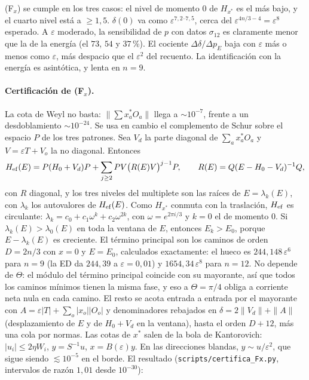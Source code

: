 \documentclass[11pt,a4paper]{article}
\theoremstyle{definition}
\theoremstyle{remark}
\newcommand{\eps}{\varepsilon}
\newcommand{\pE}{p_{E}}
\newcommand{\scr}[1]{\texttt{scripts/#1}}
\begin{document}
\noindent
(F$_x$) se cumple en los tres casos: el nivel de momento $0$ de $H_{x^*}$ es el más bajo, y el cuarto nivel
está a $\ge1{,}5$. $\delta(0)$ va como $\eps^{7{,}2\text{--}7{,}5}$, cerca del $\eps^{4n/3-4}=\eps^8$ esperado. A $\eps$
moderado, la sensibilidad de $p$ con datos $\sigma_{12}$ es claramente menor que la de la energía (el $73$, $54$ y
$37$\,\%). El cociente $\Delta\delta/\Delta\pE$ baja con $\eps$ más o menos como $\eps$, más despacio que el $\eps^2$
del recuento. La identificación con la energía es asintótica, y lenta en $n=9$.

\paragraph{Certificación de (F$_x$).} La cota de Weyl no basta: $\|\sum x^*_aO_a\|$ llega a $\sim10^{-7}$,
frente a un desdoblamiento $\sim10^{-24}$. Se usa en cambio el complemento de Schur sobre el espacio $P$ de los tres
patrones. Sea $V_d$ la parte diagonal de $\sum_ax^*_aO_a$ y $V=\eps T+V_o$ la no diagonal. Entonces
\[
  H_{\rm ef}(E)=P(H_0+V_d)P+\sum_{j\ge2}PV\big(R(E)V\big)^{j-1}P,\qquad R(E)=Q(E-H_0-V_d)^{-1}Q,
\]
con $R$ diagonal, y los tres niveles del multiplete son las raíces de $E=\lambda_k(E)$, con $\lambda_k$ los autovalores
de $H_{\rm ef}(E)$. Como $H_{x^*}$ conmuta con la traslación, $H_{\rm ef}$ es circulante:
$\lambda_k=c_0+c_1\omega^k+c_2\omega^{2k}$, con $\omega=e^{2\pi i/3}$ y $k=0$ el de momento $0$. Si
$\lambda_k(E)>\lambda_0(E)$ en toda la ventana de $E$, entonces $E_k>E_0$, porque $E-\lambda_k(E)$ es creciente. El término
principal son los caminos de orden $D=2n/3$ con $x=0$ y $E=E_0$, calculados exactamente: el hueco es
$244{,}148\,\eps^6$ para $n=9$ (la ED da $244{,}39$ a $\eps=0{,}01$) y $1654{,}34\,\eps^8$ para $n=12$. No depende de
$\Theta$: el módulo del término principal coincide con su mayorante, así que todos los caminos mínimos tienen la misma
fase, y eso a $\Theta=\pi/4$ obliga a corriente neta nula en cada camino. El resto se acota entrada a entrada por el
mayorante con $A=\eps|T|+\sum_o|x_o||O_o|$ y denominadores rebajados en $\delta=2\|V_d\|+\|A\|$ (desplazamiento de $E$
y de $H_0+V_d$ en la ventana), hasta el orden $D+12$, más una cola por normas. Las cotas de $x^*$ salen de la bola de
Kantorovich: $|u_i|\le2\eta W_i$, $y=S^{-1}u$, $x=B(\eps)y$. En las direcciones blandas, $y\sim u/\eps^2$, que sigue
siendo $\lesssim10^{-5}$ en el borde. El resultado (\scr{certifica\_Fx.py}, intervalos de razón $1{,}01$ desde
$10^{-30}$):
\end{document}
